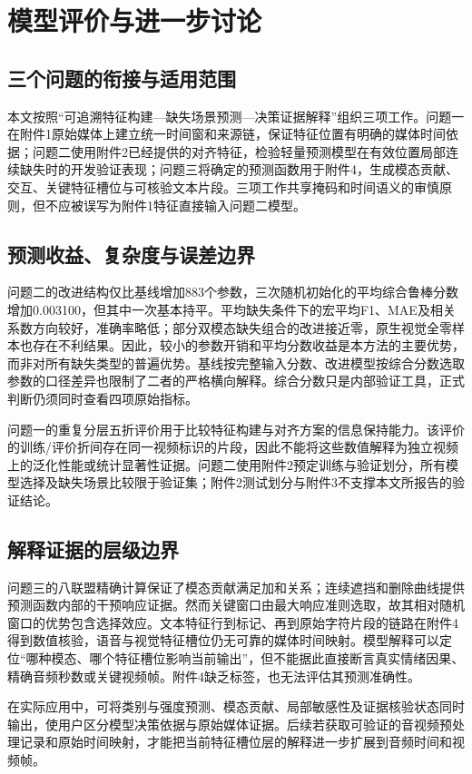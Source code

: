 \section{模型评价与进一步讨论}\label{sec:evaluation}

\subsection{三个问题的衔接与适用范围}
本文按照“可追溯特征构建—缺失场景预测—决策证据解释”组织三项工作。问题一在附件1原始媒体上建立统一时间窗和来源链，保证特征位置有明确的媒体时间依据；问题二使用附件2已经提供的对齐特征，检验轻量预测模型在有效位置局部连续缺失时的开发验证表现；问题三将确定的预测函数用于附件4，生成模态贡献、交互、关键特征槽位与可核验文本片段。三项工作共享掩码和时间语义的审慎原则，但不应被误写为附件1特征直接输入问题二模型。

\subsection{预测收益、复杂度与误差边界}
问题二的改进结构仅比基线增加883个参数，三次随机初始化的平均综合鲁棒分数增加0.003100，但其中一次基本持平。平均缺失条件下的宏平均F1、MAE及相关系数方向较好，准确率略低；部分双模态缺失组合的改进接近零，原生视觉全零样本也存在不利结果。因此，较小的参数开销和平均分数收益是本方法的主要优势，而非对所有缺失类型的普遍优势。基线按完整输入分数、改进模型按综合分数选取参数的口径差异也限制了二者的严格横向解释。综合分数只是内部验证工具，正式判断仍须同时查看四项原始指标。

问题一的重复分层五折评价用于比较特征构建与对齐方案的信息保持能力。该评价的训练/评价折间存在同一视频标识的片段，因此不能将这些数值解释为独立视频上的泛化性能或统计显著性证据。问题二使用附件2预定训练与验证划分，所有模型选择及缺失场景比较限于验证集；附件2测试划分与附件3不支撑本文所报告的验证结论。

\subsection{解释证据的层级边界}
问题三的八联盟精确计算保证了模态贡献满足加和关系；连续遮挡和删除曲线提供预测函数内部的干预响应证据。然而关键窗口由最大响应准则选取，故其相对随机窗口的优势包含选择效应。文本特征行到标记、再到原始字符片段的链路在附件4得到数值核验，语音与视觉特征槽位仍无可靠的媒体时间映射。模型解释可以定位“哪种模态、哪个特征槽位影响当前输出”，但不能据此直接断言真实情绪因果、精确音频秒数或关键视频帧。附件4缺乏标签，也无法评估其预测准确性。

在实际应用中，可将类别与强度预测、模态贡献、局部敏感性及证据核验状态同时输出，使用户区分模型决策依据与原始媒体证据。后续若获取可验证的音视频预处理记录和原始时间映射，才能把当前特征槽位层的解释进一步扩展到音频时间和视频帧。

